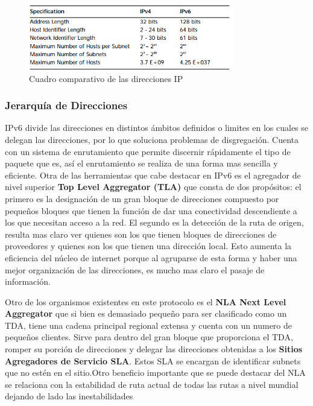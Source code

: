 \documentclass[11pt,a4paper]{article}
\begin{document}
\begin{figure}[h!]
 \centering
 \includegraphics[width=0.8\textwidth]{comparativo_ip.png}
\caption[Comparación versiones IP]{Cuadro comparativo de las direcciones IP}
\end{figure} \par

\subsubsection{Jerarquía de Direcciones}
IPv6 divide las direcciones en distintos ámbitos definidos o limites en los cuales se delegan las 
direcciones, por lo que soluciona problemas de disgregación. Cuenta con un sistema de enrutamiento 
que permite discernir rápidamente el tipo de paquete que es, así el enrutamiento se realiza de una 
forma mas sencilla y eficiente.
Otra de las herramientas que cabe destacar en IPv6 es el agregador de nivel superior \textbf{Top 
Level Aggregator (TLA)} que consta de dos propósitos: el primero es la designación de un gran bloque 
de direcciones compuesto por pequeños bloques que tienen la función de dar una conectividad 
descendiente a los que necesitan acceso a la red. El segundo es la detección de la ruta de origen, 
resulta mas claro ver quienes son los que tienen bloques de direcciones de proveedores y quienes son 
los que tienen una dirección local. Esto aumenta la eficiencia del núcleo de internet porque al 
agruparse de esta forma y haber una mejor organización de las direcciones, es mucho mas claro el 
pasaje de información.\par
Otro de los organismos existentes en este protocolo es el \textbf{NLA Next Level Aggregator} que si 
bien es demasiado pequeño para ser clasificado como un TDA, tiene una cadena principal regional 
extensa y cuenta con un numero de pequeños clientes. Sirve para dentro del gran bloque que 
proporciona el TDA, romper su porción de direcciones y delegar las direcciones obtenidas a los 
\textbf{Sitios Agregadores de Servicio SLA}. Estos SLA se encargan de identificar subnets que no 
estén en el sitio.Otro beneficio importante que se puede destacar del NLA se relaciona con la 
estabilidad de ruta actual de todas las rutas a nivel mundial dejando de lado las inestabilidades 
\end{document}
